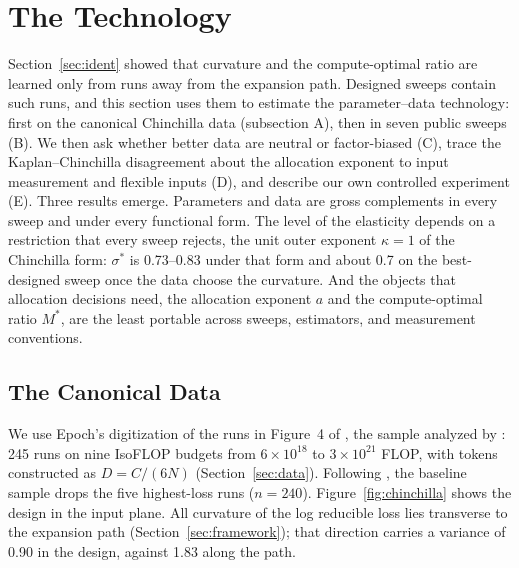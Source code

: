 
\section{The Technology}\label{sec:tech}

Section~\ref{sec:ident} showed that curvature and the compute-optimal ratio are learned only from runs away from the
expansion path. Designed sweeps contain such runs, and this section uses them to estimate the parameter--data
technology: first on the canonical Chinchilla data (subsection A), then in seven public sweeps (B). We then ask whether better data are neutral or factor-biased (C), trace the
Kaplan--Chinchilla disagreement about the allocation exponent to input measurement and flexible inputs (D), and
describe our own controlled experiment (E). Three results emerge. Parameters and
data are gross complements in every sweep and under every functional form. The level of the elasticity depends on a
restriction that every sweep rejects, the unit outer exponent $\kappa=1$ of the Chinchilla form: $\sigma^*$ is
0.73--0.83 under that form and about 0.7 on the best-designed sweep once the data choose the curvature. And the objects
that allocation decisions need, the allocation exponent $a$ and the compute-optimal ratio $M^*$, are the least
portable across sweeps, estimators, and measurement conventions.

\subsection{The Canonical Data}\label{sec:tech:chinchilla}

We use Epoch's digitization of the runs in Figure~4 of \citet{hoffmann2022training}, the sample analyzed by
\citet{besiroglu2024chinchilla}: 245 runs on nine IsoFLOP budgets from $6\times10^{18}$ to $3\times10^{21}$ FLOP, with
tokens constructed as $D=C/(6N)$ (Section~\ref{sec:data}). Following \citet{besiroglu2024chinchilla}, the baseline
sample drops the five highest-loss runs ($n=240$). Figure~\ref{fig:chinchilla} shows the design in the input plane.
All curvature of the log reducible loss lies transverse to the expansion path (Section~\ref{sec:framework}); that
direction carries a variance of 0.90 in the design, against 1.83 along the path.

